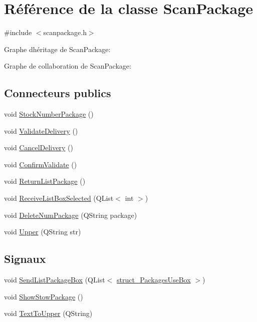 \hypertarget{class_scan_package}{}\section{Référence de la classe Scan\+Package}
\label{class_scan_package}


{\ttfamily \#include $<$scanpackage.\+h$>$}



Graphe d\textquotesingle{}héritage de Scan\+Package\+:


Graphe de collaboration de Scan\+Package\+:
\subsection*{Connecteurs publics}
\begin{DoxyCompactItemize}
\item 
void \hyperlink{class_scan_package_a9eba77f1f9ce24f54b3c78172ed2a5b2}{Stock\+Number\+Package} ()
\item 
void \hyperlink{class_scan_package_a619ca3e30a8c4549c030f279d384e76d}{Validate\+Delivery} ()
\item 
void \hyperlink{class_scan_package_a0704734be634f7479a63725ee02ab077}{Cancel\+Delivery} ()
\item 
void \hyperlink{class_scan_package_add67e1c2317de5884cc5358f0bc49f18}{Confirm\+Validate} ()
\item 
void \hyperlink{class_scan_package_a2dc6dd1965d342ff25f4604539662bd3}{Return\+List\+Package} ()
\item 
void \hyperlink{class_scan_package_adec50d2f172142caef4f4081b4618316}{Receive\+List\+Box\+Selected} (Q\+List$<$ int $>$)
\item 
void \hyperlink{class_scan_package_a9805f5410fccbbfc56bac6084fb6b9ed}{Delete\+Num\+Package} (Q\+String package)
\item 
void \hyperlink{class_scan_package_a93955172cd5352cb92a8b75dd7ee6e82}{Upper} (Q\+String str)
\end{DoxyCompactItemize}
\subsection*{Signaux}
\begin{DoxyCompactItemize}
\item 
void \hyperlink{class_scan_package_af3d61ae4476313140053aa4ce19892fd}{Send\+List\+Package\+Box} (Q\+List$<$ \hyperlink{structstruct___packages_use_box}{struct\+\_\+\+Packages\+Use\+Box} $>$)
\item 
void \hyperlink{class_scan_package_a2e0e88260c744b5e5f22bbc451025264}{Show\+Stow\+Package} ()
\item 
void \hyperlink{class_scan_package_ac82d2e52100e738a717676a622bf9541}{Text\+To\+Upper} (Q\+String)
\end{DoxyCompactItemize}
